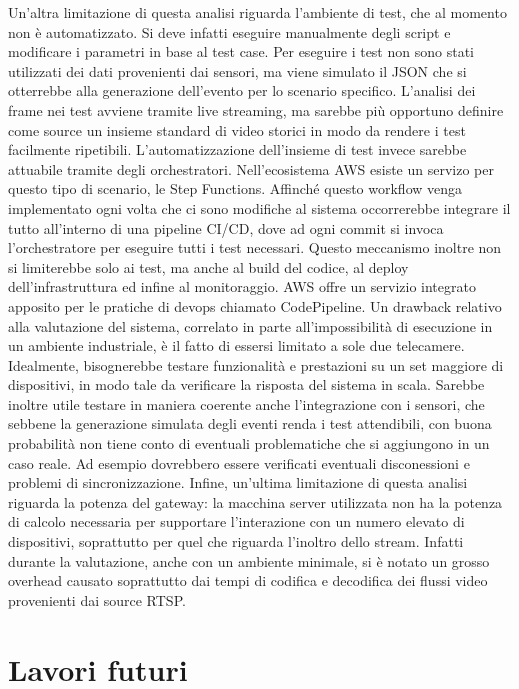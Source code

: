 Un'altra limitazione di questa analisi riguarda l'ambiente di test, che al momento non è automatizzato. Si deve infatti eseguire manualmente degli script e modificare i parametri in base al test case. Per eseguire i test non sono stati utilizzati dei dati provenienti dai sensori, ma viene simulato il JSON che si otterrebbe alla generazione dell'evento per lo scenario specifico. L'analisi dei frame nei test avviene tramite live streaming, ma sarebbe più opportuno definire come source un insieme standard di video storici in modo da rendere i test facilmente ripetibili. L'automatizzazione dell'insieme di test invece sarebbe attuabile tramite degli orchestratori. Nell'ecosistema AWS esiste un servizo per questo tipo di scenario, le Step Functions. Affinché questo workflow venga implementato ogni volta che ci sono modifiche al sistema occorrerebbe integrare il tutto all'interno di una pipeline CI/CD, dove ad ogni commit si invoca l'orchestratore per eseguire tutti i test necessari. Questo meccanismo inoltre non si limiterebbe solo ai test, ma anche al build del codice, al deploy dell'infrastruttura ed infine al monitoraggio. AWS offre un servizio integrato apposito per le pratiche di devops chiamato CodePipeline. Un drawback relativo alla valutazione del sistema, correlato in parte all'impossibilità di esecuzione in un ambiente industriale, è il fatto di essersi limitato a sole due telecamere. Idealmente, bisognerebbe testare funzionalità e prestazioni su un set maggiore di dispositivi, in modo tale da verificare la risposta del sistema in scala. Sarebbe inoltre utile testare in maniera coerente anche l'integrazione con i sensori, che sebbene la generazione simulata degli eventi renda i test attendibili, con buona probabilità non tiene conto di eventuali problematiche che si aggiungono in un caso reale. Ad esempio dovrebbero essere verificati eventuali disconessioni e problemi di sincronizzazione. 
Infine, un'ultima limitazione di questa analisi riguarda la potenza del gateway: la macchina server utilizzata non ha la potenza di calcolo necessaria per supportare l'interazione con un numero elevato di dispositivi, soprattutto per quel che riguarda l'inoltro dello stream. Infatti durante la valutazione, anche con un ambiente minimale, si è notato un grosso overhead causato soprattutto dai tempi di codifica e decodifica dei flussi video provenienti dai source RTSP.  

\section{Lavori futuri}

